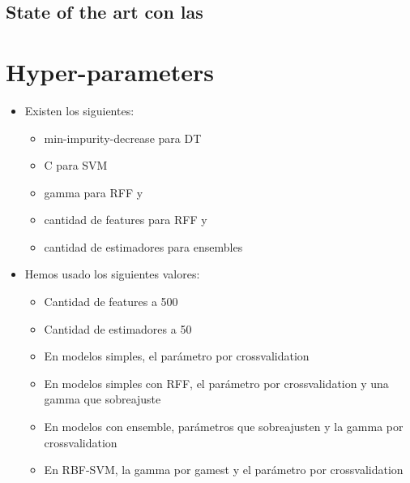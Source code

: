 \begin{note}
  \subsection{State of the art con las \Nys}
\end{note}


\section{Hyper-parameters}
\begin{note}
  \begin{itemize}
    \item Existen los siguientes:
    \begin{itemize}
      \item min-impurity-decrease para DT
      \item C para SVM
      \item gamma para RFF y \Nys
      \item cantidad de features para RFF y \Nys
      \item cantidad de estimadores para ensembles
    \end{itemize}
    \item Hemos usado los siguientes valores:
    \begin{itemize}
      \item Cantidad de features a 500
      \item Cantidad de estimadores a 50
      \item En modelos simples, el parámetro por crossvalidation
      \item En modelos simples con RFF, el parámetro por crossvalidation
      y una gamma que sobreajuste
      \item En modelos con ensemble, parámetros que sobreajusten y la gamma
      por crossvalidation
      \item En RBF-SVM, la gamma por gamest y el parámetro por crossvalidation
    \end{itemize}
  \end{itemize}
\end{note}
